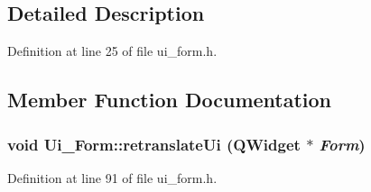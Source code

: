 \subsection{Detailed Description}


Definition at line 25 of file ui\_\-form.h.

\subsection{Member Function Documentation}
\hypertarget{class_ui___form_ad05dfdbcadce5efd8a7e8da759e41aa4}{
\subsubsection[{retranslateUi}]{\setlength{\rightskip}{0pt plus 5cm}void Ui\_\-Form::retranslateUi (QWidget $\ast$ {\em Form})}}
\label{class_ui___form_ad05dfdbcadce5efd8a7e8da759e41aa4}


Definition at line 91 of file ui\_\-form.h.


